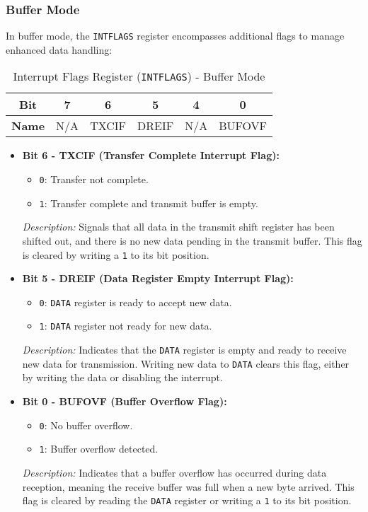  \subsubsection{Buffer Mode}
  In buffer mode, the \texttt{INTFLAGS} register encompasses additional flags to manage enhanced data handling:
  
  \begin{table}[H]
      \centering
      \caption{Interrupt Flags Register (\texttt{INTFLAGS}) - Buffer Mode}
      \begin{tabular}{@{}cccccc@{}}
          \toprule
          \textbf{Bit} & 7 & 6 & 5 & 4 & 0 \\ \midrule
          \textbf{Name} & N/A & TXCIF & DREIF & N/A & BUFOVF \\ \bottomrule
      \end{tabular}
      \label{tab:intflags_buffer}
  \end{table}
  
  \begin{itemize}
      
      \item \textbf{Bit 6 - TXCIF (Transfer Complete Interrupt Flag):} 
      \begin{itemize}
          \item \texttt{0}: Transfer not complete.
          \item \texttt{1}: Transfer complete and transmit buffer is empty.
      \end{itemize}
      \textit{Description:} Signals that all data in the transmit shift register has been shifted out, and there is no new data pending in the transmit buffer. This flag is cleared by writing a \texttt{1} to its bit position.
      
      \item \textbf{Bit 5 - DREIF (Data Register Empty Interrupt Flag):} 
      \begin{itemize}
          \item \texttt{0}: \texttt{DATA} register is ready to accept new data.
          \item \texttt{1}: \texttt{DATA} register not ready for new data.
      \end{itemize}
      \textit{Description:} Indicates that the \texttt{DATA} register is empty and ready to receive new data for transmission. Writing new data to \texttt{DATA} clears this flag, either by writing the data or disabling the interrupt.
      
      \item \textbf{Bit 0 - BUFOVF (Buffer Overflow Flag):} 
      \begin{itemize}
          \item \texttt{0}: No buffer overflow.
          \item \texttt{1}: Buffer overflow detected.
      \end{itemize}
      \textit{Description:} Indicates that a buffer overflow has occurred during data reception, meaning the receive buffer was full when a new byte arrived. This flag is cleared by reading the \texttt{DATA} register or writing a \texttt{1} to its bit position.
  \end{itemize}
  
